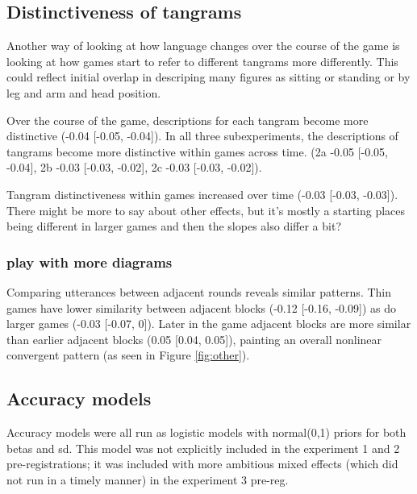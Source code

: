 \documentclass[
  english,
  a4paper,
]{article}
\begin{document}
\hypertarget{distinctiveness-of-tangrams}{%
\subsection{Distinctiveness of tangrams}\label{distinctiveness-of-tangrams}}

Another way of looking at how language changes over the course of the game is looking at how games start to refer to different tangrams more differently. This could reflect initial overlap in descriping many figures as sitting or standing or by leg and arm and head position.

Over the course of the game, descriptions for each tangram become more distinctive (-0.04 {[}-0.05, -0.04{]}).
In all three subexperiments, the descriptions of tangrams become more distinctive within games across time. (2a -0.05 {[}-0.05, -0.04{]}, 2b -0.03 {[}-0.03, -0.02{]}, 2c -0.03 {[}-0.03, -0.02{]}).

Tangram distinctiveness within games increased over time (-0.03 {[}-0.03, -0.03{]}). There might be more to say about other effects, but it's mostly a starting places being different in larger games and then the slopes also differ a bit?

\hypertarget{play-with-more-diagrams}{%
\subsubsection{play with more diagrams}\label{play-with-more-diagrams}}

Comparing utterances between adjacent rounds reveals similar patterns. Thin games have lower similarity between adjacent blocks (-0.12 {[}-0.16, -0.09{]}) as do larger games (-0.03 {[}-0.07, 0{]}). Later in the game adjacent blocks are more similar than earlier adjacent blocks (0.05 {[}0.04, 0.05{]}), painting an overall nonlinear convergent pattern (as seen in Figure \ref{fig:other}).

\hypertarget{accuracy-models}{%
\subsection{Accuracy models}\label{accuracy-models}}

Accuracy models were all run as logistic models with normal(0,1) priors for both betas and sd. This model was not explicitly included in the experiment 1 and 2 pre-registrations; it was included with more ambitious mixed effects (which did not run in a timely manner) in the experiment 3 pre-reg.
\end{document}
